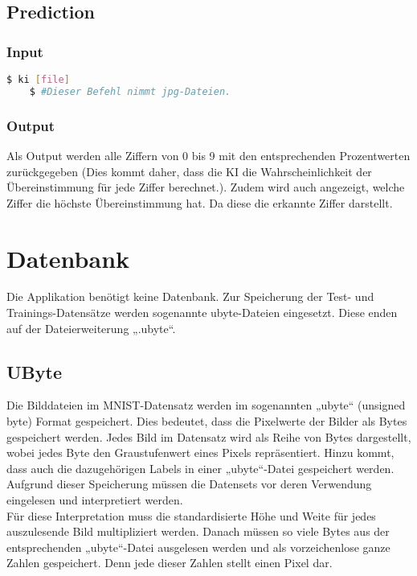 \subsection{Prediction}
\label{sec:DesignAnwendung}
\subsubsection{Input}
\label{sec:DesignUseInput}
\begin{lstlisting}[language=bash]
	$ ki [file]
	$ #Dieser Befehl nimmt jpg-Dateien.
\end{lstlisting}

\subsubsection{Output}
\label{sec:DesignUseOutput}
Als Output werden alle Ziffern von 0 bis 9 mit den entsprechenden Prozentwerten zurückgegeben (Dies kommt daher, dass die KI die Wahrscheinlichkeit der Übereinstimmung für jede Ziffer berechnet.). Zudem wird auch angezeigt, welche Ziffer die höchste Übereinstimmung hat. Da diese die erkannte Ziffer darstellt.

\section{Datenbank}
\label{sec:DesignDatenbank}
Die Applikation benötigt keine Datenbank. Zur Speicherung der Test- und Trainings-Datensätze werden sogenannte ubyte-Dateien eingesetzt. Diese enden auf der Dateierweiterung „.ubyte“.

\subsection{UByte}
\label{sec:UByte}
Die Bilddateien im MNIST-Datensatz werden im sogenannten „ubyte“ (unsigned byte) Format gespeichert. Dies bedeutet, dass die Pixelwerte der Bilder als Bytes gespeichert werden. Jedes Bild im Datensatz wird als Reihe von Bytes dargestellt, wobei jedes Byte den Graustufenwert eines Pixels repräsentiert. Hinzu kommt, dass auch die dazugehörigen Labels in einer „ubyte“-Datei gespeichert werden.
\\
Aufgrund dieser Speicherung müssen die Datensets vor deren Verwendung eingelesen und interpretiert werden. 
\\
Für diese Interpretation muss die standardisierte Höhe und Weite für jedes auszulesende Bild multipliziert werden. Danach müssen so viele Bytes aus der entsprechenden „ubyte“-Datei ausgelesen werden und als vorzeichenlose ganze Zahlen gespeichert. Denn jede dieser Zahlen stellt einen Pixel dar.

